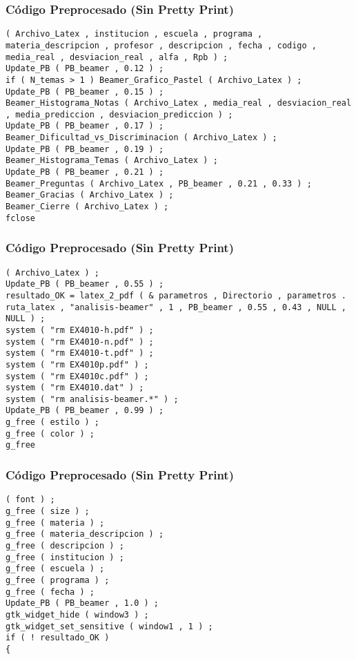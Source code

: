 \documentclass{beamer}
\begin{document}
\begin{frame}[fragile]
\frametitle{C\'odigo Preprocesado (Sin Pretty Print)}
\begin{lstlisting}[style=CStyle]
( Archivo_Latex , institucion , escuela , programa , materia_descripcion , profesor , descripcion , fecha , codigo , media_real , desviacion_real , alfa , Rpb ) ; 
Update_PB ( PB_beamer , 0.12 ) ; 
if ( N_temas > 1 ) Beamer_Grafico_Pastel ( Archivo_Latex ) ; 
Update_PB ( PB_beamer , 0.15 ) ; 
Beamer_Histograma_Notas ( Archivo_Latex , media_real , desviacion_real , media_prediccion , desviacion_prediccion ) ; 
Update_PB ( PB_beamer , 0.17 ) ; 
Beamer_Dificultad_vs_Discriminacion ( Archivo_Latex ) ; 
Update_PB ( PB_beamer , 0.19 ) ; 
Beamer_Histograma_Temas ( Archivo_Latex ) ; 
Update_PB ( PB_beamer , 0.21 ) ; 
Beamer_Preguntas ( Archivo_Latex , PB_beamer , 0.21 , 0.33 ) ; 
Beamer_Gracias ( Archivo_Latex ) ; 
Beamer_Cierre ( Archivo_Latex ) ; 
fclose \end{lstlisting}
\end{frame}
\begin{frame}[fragile]
\frametitle{C\'odigo Preprocesado (Sin Pretty Print)}
\begin{lstlisting}[style=CStyle]
( Archivo_Latex ) ; 
Update_PB ( PB_beamer , 0.55 ) ; 
resultado_OK = latex_2_pdf ( & parametros , Directorio , parametros . ruta_latex , "analisis-beamer" , 1 , PB_beamer , 0.55 , 0.43 , NULL , NULL ) ; 
system ( "rm EX4010-h.pdf" ) ; 
system ( "rm EX4010-n.pdf" ) ; 
system ( "rm EX4010-t.pdf" ) ; 
system ( "rm EX4010p.pdf" ) ; 
system ( "rm EX4010c.pdf" ) ; 
system ( "rm EX4010.dat" ) ; 
system ( "rm analisis-beamer.*" ) ; 
Update_PB ( PB_beamer , 0.99 ) ; 
g_free ( estilo ) ; 
g_free ( color ) ; 
g_free \end{lstlisting}
\end{frame}
\begin{frame}[fragile]
\frametitle{C\'odigo Preprocesado (Sin Pretty Print)}
\begin{lstlisting}[style=CStyle]
( font ) ; 
g_free ( size ) ; 
g_free ( materia ) ; 
g_free ( materia_descripcion ) ; 
g_free ( descripcion ) ; 
g_free ( institucion ) ; 
g_free ( escuela ) ; 
g_free ( programa ) ; 
g_free ( fecha ) ; 
Update_PB ( PB_beamer , 1.0 ) ; 
gtk_widget_hide ( window3 ) ; 
gtk_widget_set_sensitive ( window1 , 1 ) ; 
if ( ! resultado_OK ) 
{ \end{lstlisting}
\end{frame}
\end{document}
